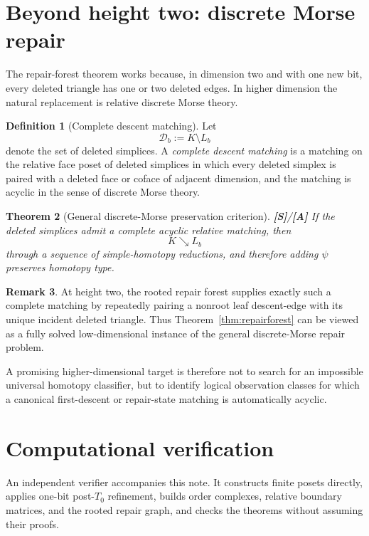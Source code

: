 \documentclass[11pt]{article}
\newtheorem{theorem}{Theorem}[section]
\theoremstyle{definition}
\newtheorem{definition}[theorem]{Definition}
\newtheorem{remark}[theorem]{Remark}
\newcommand{\statusS}{\textbf{[S]}}
\newcommand{\statusA}{\textbf{[A]}}
\begin{document}
\section{Beyond height two: discrete Morse repair}

The repair-forest theorem works because, in dimension two and with one new bit, every deleted triangle has one or two deleted edges. In higher dimension the natural replacement is relative discrete Morse theory.

\begin{definition}[Complete descent matching]
Let
\[
\mathcal D_b:=K\setminus L_b
\]
denote the set of deleted simplices. A \emph{complete descent matching} is a matching on the relative face poset of deleted simplices in which every deleted simplex is paired with a deleted face or coface of adjacent dimension, and the matching is acyclic in the sense of discrete Morse theory.
\end{definition}

\begin{theorem}[General discrete-Morse preservation criterion]\label{thm:morse}
\statusS/\statusA\;
If the deleted simplices admit a complete acyclic relative matching, then
\[
K\searrow L_b
\]
through a sequence of simple-homotopy reductions, and therefore adding $\psi$ preserves homotopy type.
\end{theorem}

\begin{remark}
At height two, the rooted repair forest supplies exactly such a complete matching by repeatedly pairing a nonroot leaf descent-edge with its unique incident deleted triangle. Thus Theorem~\ref{thm:repairforest} can be viewed as a fully solved low-dimensional instance of the general discrete-Morse repair problem.
\end{remark}

A promising higher-dimensional target is therefore not to search for an impossible universal homotopy classifier, but to identify logical observation classes for which a canonical first-descent or repair-state matching is automatically acyclic.

\section{Computational verification}

An independent verifier accompanies this note. It constructs finite posets directly, applies one-bit post-$T_0$ refinement, builds order complexes, relative boundary matrices, and the rooted repair graph, and checks the theorems without assuming their proofs.
\end{document}
